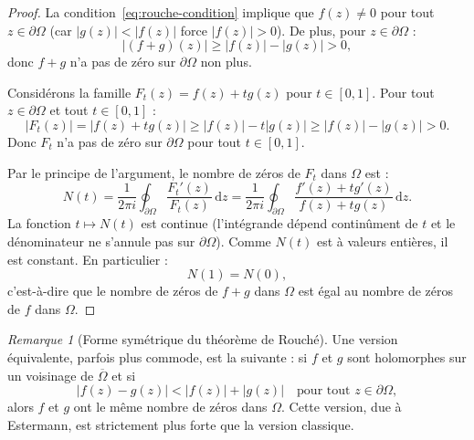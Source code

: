 \documentclass[12pt,a4paper,openany]{book}
\theoremstyle{definition}
\theoremstyle{plain}
\theoremstyle{remark}
\newtheorem{remarque}[definition]{Remarque}
\DeclareMathOperator{\re}{Re}
\DeclareMathOperator{\im}{Im}
\newcommand{\dd}{\mathrm{d}}
\newcommand{\abs}[1]{\left|#1\right|}
\begin{document}
\begin{proof}
La condition~\eqref{eq:rouche-condition} implique que $f(z) \neq 0$ pour tout
$z \in \partial\Omega$ (car $\abs{g(z)} < \abs{f(z)}$ force
$\abs{f(z)} > 0$). De plus, pour $z \in \partial\Omega$ :
\[
  \abs{(f+g)(z)} \geq \abs{f(z)} - \abs{g(z)} > 0,
\]
donc $f + g$ n'a pas de zéro sur $\partial\Omega$ non plus.

Considérons la famille $F_t(z) = f(z) + tg(z)$ pour $t \in [0,1]$.
Pour tout $z \in \partial\Omega$ et tout $t \in [0,1]$ :
\[
  \abs{F_t(z)} = \abs{f(z) + tg(z)} \geq \abs{f(z)} - t\abs{g(z)}
  \geq \abs{f(z)} - \abs{g(z)} > 0.
\]
Donc $F_t$ n'a pas de zéro sur $\partial\Omega$ pour tout $t \in [0,1]$.

Par le principe de l'argument, le nombre de zéros de $F_t$ dans $\Omega$ est :
\[
  N(t) = \frac{1}{2\pi i} \oint_{\partial\Omega} \frac{F_t'(z)}{F_t(z)} \, \dd z
  = \frac{1}{2\pi i} \oint_{\partial\Omega} \frac{f'(z) + tg'(z)}{f(z) + tg(z)} \, \dd z.
\]
La fonction $t \mapsto N(t)$ est continue (l'intégrande dépend continûment de $t$
et le dénominateur ne s'annule pas sur $\partial\Omega$). Comme $N(t)$ est à
valeurs entières, il est constant. En particulier :
\[
  N(1) = N(0),
\]
c'est-à-dire que le nombre de zéros de $f + g$ dans $\Omega$ est égal au nombre
de zéros de $f$ dans $\Omega$.
\end{proof}

\begin{remarque}[Forme symétrique du théorème de Rouché]\label{rem:rouche-symetrique}
Une version équivalente, parfois plus commode, est la suivante : si $f$ et $g$
sont holomorphes sur un voisinage de $\overline{\Omega}$ et si
\[
  \abs{f(z) - g(z)} < \abs{f(z)} + \abs{g(z)}
  \quad \text{pour tout } z \in \partial\Omega,
\]
alors $f$ et $g$ ont le même nombre de zéros dans $\Omega$. Cette version,
due à Estermann, est strictement plus forte que la version classique.
\end{remarque}

\begin{center}
\end{center}
\end{document}
